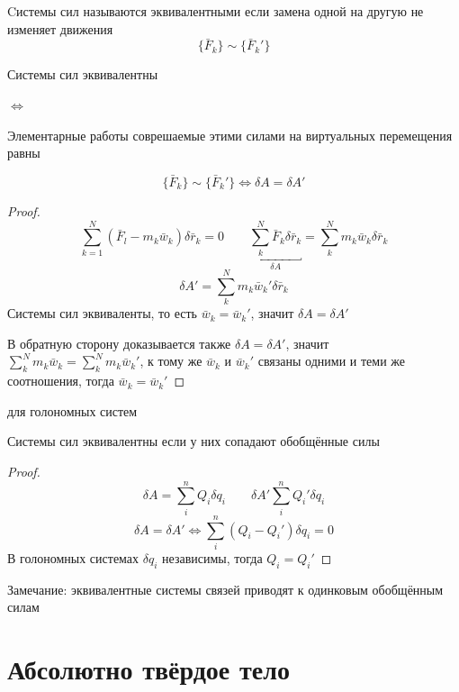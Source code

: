 \documentclass[crop=false]{standalone}
\begin{document}
\Def Cистемы сил называются эквивалентными если замена одной на другую не изменяет движения
\[\{\bar F_k\} \sim \{\bar F_k'\}\]

\begin{theorem}
    Системы сил эквивалентны
    
    $\iff$

    Элементарные работы соврешаемые этими силами на виртуальных перемещения равны

    \[\{\bar F_k\} \sim \{\bar F_k'\} \iff \delta A  = \delta A'\]
\end{theorem}
\begin{proof}
    \[\sum_{k=1}^{N} (\bar F_l - m_k \bar w_k) \delta \bar r_k = 0 \qquad \underbracket{\sum_{k}^{N} \bar F_k \delta \bar r_k}_{\delta A} = \sum_{k}^{N} m_k \bar w_k \delta \bar r_k\]
    \[\delta A' = \sum_k^N m_k \bar w_k' \delta \bar r_k \]
    Системы сил эквиваленты, то есть $\bar w_k = \bar w_k'$, значит $\delta A = \delta A'$

    В обратную сторону доказывается также $\delta A = \delta A'$, значит $\sum_k^N m_k \bar w_k = \sum_k^N m_k \bar w_k'$, к тому же $\bar w_k$ и $\bar w_k'$ связаны одними и теми же соотношения,  тогда $\bar w_k = \bar w_k'$
\end{proof}

\noindent \keypoint 
для голономных систем

Системы сил эквивалентны если у них сопадают обобщённые силы
\begin{proof}
\[\delta A = \sum_i^n Q_i \delta q_i \qquad \delta A' \sum_i^n Q_i' \delta q_i\]
\[\delta A = \delta A' \iff \sum_i^n (Q_i - Q_i') \delta q_i = 0\]
В голономных системах $\delta q_i$ независимы, тогда $Q_i = Q_i'$
\end{proof}
Замечание: эквивалентные системы связей приводят к одинковым обобщённым силам
    
\section{Абсолютно твёрдое тело}
\end{document}
